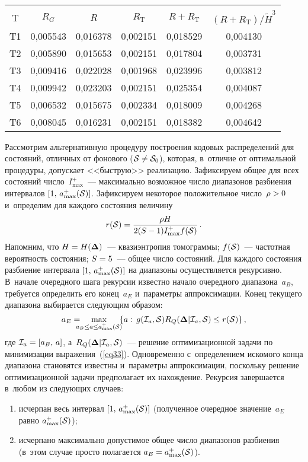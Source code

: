 \begin{multicols}{2}
\begin{table*}
\begin{center}
\begin{tabular}{|c|c|c|c|c|c|}
\hline
&&&&&\\[-9pt]
T  & $R_G$ &  $R$ & $R_{\mathrm{T}}$ & $R+R_{\mathrm{T}}$ & 
$(R+R_{\mathrm{T}})/\tilde{H}^3$\\
\hline
T1 & 0,005543 & 0,016378 & 0,002151 & 0,018529 & 0,004130\\
T2 & 0,005890 & 0,015653 & 0,002151 & 0,017804 & 0,003731\\
T3 & 0,009416 & 0,022028 & 0,001968 & 0,023996 & 0,003812\\
T4 & 0,009942 & 0,023203 & 0,002151 & 0,025354 & 0,004087\\
T5 & 0,006532 & 0,015675 & 0,002334 & 0,018009 & 0,004268\\
T6 & 0,008045 & 0,016231 & 0,002151 & 0,018382 & 0,004642\\
\hline
\end{tabular}
\end{center}
\end{table*}

Рассмотрим альтернативную процедуру построения кодовых распределений для состояний, 
отличных от фонового (${\cal S}\hm\neq {\cal S}_0$), которая, в~отличие от 
оптимальной процедуры, допускает <<быструю>> реализацию. Зафиксируем общее 
для всех со\-сто\-яний число~$I_{\max}^+$~--- 
максимально возможное число диапазонов разбиения интервалов 
$[1,\,a_{\max}^+({\cal S})]$. Зафиксируем некоторое положительное число~$\rho\hm> 0$ 
и~определим для каждого состояния величину
$$
r({\cal S}) = \displaystyle\frac{\displaystyle \rho H\mathstrut}{\displaystyle 2( S-1) I_{\max}^+ f({\cal S})\mathstrut}\,.
$$
Напомним, что $H\hm=H(\boldsymbol{\Delta})$~--- квазиэнтропия томограммы; $f(\cal S)$~--- 
частотная вероятность состояния; $S\hm=5$~--- 
общее число состояний. Для каждого состояния разбиение интервала 
$[1,\,a_{\max}^+({\cal S})]$ на диапазоны осуществляется рекурсивно. 
В~начале очередного шага рекурсии известно начало очередного диапазона~$a_B$,
 требуется определить его конец~$a_E$ и~параметры аппроксимации. Конец 
 текущего диапазона выбирается следующим образом:
$$
a_E = \hspace*{-8pt}\max\limits_{a_B\le a\le a_{\max}^+({\cal S})}\hspace*{-5pt}
\left\{ a:\, g({\cal I}_a,{\cal S})
R_Q(\boldsymbol{\Delta}|{\cal I}_a,{\cal S}) \le r({\cal S})\right\},
$$
где ${\cal I}_a\hm= [a_B,\,a]$, а~$R_Q(\boldsymbol{\Delta}|{\cal I}_a,{\cal S})$~--- 
решение оптимизационной задачи по минимизации выражения~(\ref{eq33}). 
Одновременно с~определением искомого конца диапазона становятся 
известны и~параметры аппроксимации, поскольку решение оптимизационной 
задачи предполагает их нахождение. Рекурсия завершается в~любом из следующих случаев:
\begin{enumerate}[(1)]
\item исчерпан весь интервал $[1,\,a_{\max}^+({\cal S})]$ 
(полученное очередное  значение~$a_E$ равно $a_{\max}^+({\cal S})$);
\item исчерпано максимально допустимое общее чис\-ло диапазонов разбиения (в~этом 
случае просто полагается $a_E\hm= a_{\max}^+({\cal S})$).
\end{enumerate}


\end{multicols}
